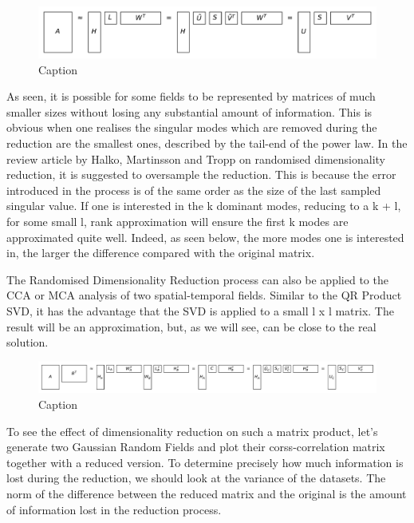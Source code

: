 \documentclass{acm_proc_article-sp}
\begin{document}
\begin{figure}[h]
\begin{center}
\includegraphics[width=\columnwidth]{Results/reduceSizeRandomisedSquare.pdf}
\caption[Small caption]{Caption}
\label{fig:reduceSizeRandomisedSquare}
\end{center}
\end{figure}
As seen, it is possible for some fields to be represented by matrices of much smaller sizes without losing any substantial amount of information. This is obvious when one realises the singular modes which are removed during the reduction are the smallest ones, described by the tail-end of the power law. In the review article by Halko, Martinsson and Tropp on randomised dimensionality reduction, it is suggested to oversample the reduction. This is because the error introduced in the process is of the same order as the size of the last sampled singular value. If one is interested in the k dominant modes, reducing to a k + l, for some small l, rank approximation will ensure the first k modes are approximated quite well. Indeed, as seen below, the more modes one is interested in, the larger the difference compared with the original matrix.

The Randomised Dimensionality Reduction process can also be applied to the CCA or MCA analysis of two spatial-temporal fields. Similar to the QR Product SVD, it has the advantage that the SVD is applied to a small l x l matrix. The result will be an approximation, but, as we will see, can be close to the real solution.

\begin{figure}[h]
\begin{center}
\includegraphics[width=\columnwidth]{Results/randomisedSquareProductSVD.pdf}
\caption[Small caption]{Caption}
\label{fig:randomisedSquareProductSVD}
\end{center}
\end{figure}
To see the effect of dimensionality reduction on such a matrix product, let's generate two Gaussian Random Fields and plot their corss-correlation matrix together with a reduced version. To determine precisely how much information is lost during the reduction, we should look at the variance of the datasets. The norm of the difference between the reduced matrix and the original is the amount of information lost in the reduction process.
\end{document}

